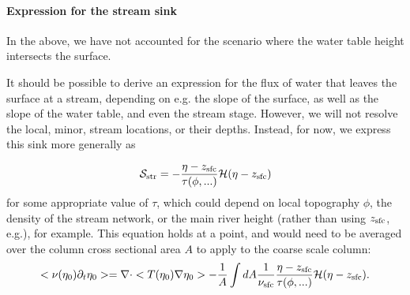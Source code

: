 \documentclass[twoside,10pt]{report}
\begin{document}
\paragraph{Expression for the stream sink}
In the above, we have not accounted for the scenario where the water table height intersects the surface.

It should be possible to derive an expression for the flux of water that leaves the surface at a stream, depending on e.g. the slope of the surface, as well as the slope of the water table, and even the stream stage.  However, we will not resolve the local, minor, stream locations, or their depths. Instead, for now, we express this sink more generally as

\begin{equation}
    \mathcal{S_{\rm str}} = -\frac{\eta - z_{\rm sfc}}{\tau(\phi,...) } \mathcal{H}(\eta - z_{\rm sfc})
\end{equation}
for some appropriate value of $\tau$, which could depend on local topography $\phi$, the density of the stream network, or the main river height (rather than using $z_{\rm sfc}$, e.g.), for example. This equation holds at a point, and would need to be averaged over the column cross sectional area $A$ to apply to the coarse scale column:
\begin{equation}
    <\nu(\eta_0)\partial_t \eta_0>  = \nabla \cdot <T(\eta_0)\nabla \eta_0>-\frac{1}{A}\int dA \frac{1}{\nu_{\rm sfc}}\frac{\eta - z_{\rm sfc}}{\tau(\phi,...)} \mathcal{H}(\eta - z_{\rm sfc}).
\end{equation}


\end{document}
